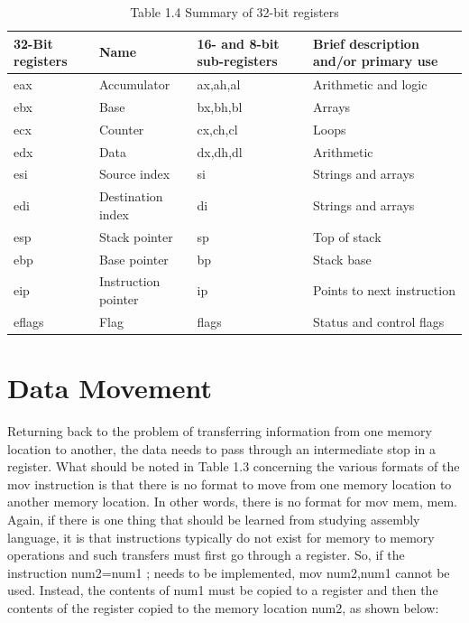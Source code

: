 \documentclass[10pt]{book}
\begin{document}
\begin{table}[htbp]
\begin{center}
\captionsetup{labelformat=empty}
\caption{Table 1.4 Summary of 32-bit registers}
\begin{tabular}{|l|l|l|l|}
\hline
32-Bit registers & Name & 16- and 8-bit sub-registers & Brief description and/or primary use \\
\hline
eax & Accumulator & ax,ah,al & Arithmetic and logic \\
\hline
ebx & Base & bx,bh,bl & Arrays \\
\hline
ecx & Counter & cx,ch,cl & Loops \\
\hline
edx & Data & dx,dh,dl & Arithmetic \\
\hline
esi & Source index & si & Strings and arrays \\
\hline
edi & Destination index & di & Strings and arrays \\
\hline
esp & Stack pointer & sp & Top of stack \\
\hline
ebp & Base pointer & bp & Stack base \\
\hline
eip & Instruction pointer & ip & Points to next instruction \\
\hline
eflags & Flag & flags & Status and control flags \\
\hline
\end{tabular}
\end{center}
\end{table}

\section{Data Movement}
Returning back to the problem of transferring information from one memory location to another, the data needs to pass through an intermediate stop in a register. What should be noted in Table 1.3 concerning the various formats of the mov instruction is that there is no format to move from one memory location to another memory location. In other words, there is no format for mov mem, mem. Again, if there is one thing that should be learned from studying assembly language, it is that instructions typically do not exist for memory to memory operations and such transfers must first go through a register. So, if the instruction num2=num1 ; needs to be implemented, mov num2,num1 cannot be used. Instead, the contents of num1 must be copied to a register and then the contents of the register copied to the memory location num2, as shown below:
\end{document}
